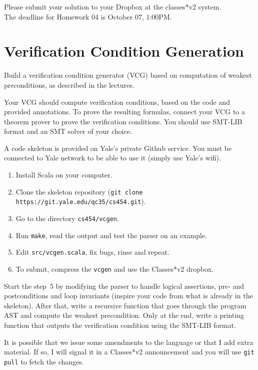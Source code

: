 \documentclass[11pt]{article}
\begin{document}
\makehwtitle%


Please submit your solution to your Dropbox at the classes*v2 system.\\

The deadline for Homework 04 is October 07, 1:00PM.

\section{Verification Condition Generation}

Build a verification condition generator (VCG) based on computation of weakest
preconditions, as described in the lectures.

Your VCG should compute verification conditions, based on the code and
provided annotations. To prove the resulting formulas, connect your VCG to a
theorem prover to prove the verification conditions. You should use SMT-LIB
format and an SMT solver of your choice.

A code skeleton is provided on Yale's private Github service.  You must be
connected to Yale network to be able to use it (simply use Yale's wifi).

\begin{enumerate}
\item Install Scala on your computer.
\item Clone the skeleton repository (\texttt{git clone https://git.yale.edu/qc35/cs454.git}).
\item Go to the directory \texttt{cs454/vcgen}.
\item Run \texttt{make}, read the output and test the parser on an example.
\item Edit \texttt{src/vcgen.scala}, fix bugs, rinse and repeat.
\item To submit, compress the \texttt{vcgen} and use the Classes*v2 dropbox.
\end{enumerate}

Start the step~5 by modifying the parser to handle logical assertions,
pre- and postconditions and loop invariants (inspire your code from what
is already in the skeleton).  After that, write a recursive function that
goes through the program AST and compute the weakest precondition.  Only
at the end, write a printing function that outputs the verification condition
using the SMT-LIB format.

It is possible that we issue some amendments to the language or that I
add extra material.  If so, I will signal it in a Classes*v2 announcement
and you will use \texttt{git pull} to fetch the changes.
\end{document}
